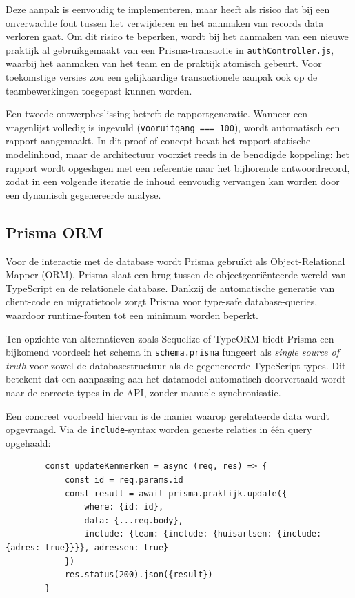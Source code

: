 Deze aanpak is eenvoudig te implementeren, maar heeft als risico dat bij een onverwachte fout tussen het verwijderen en het aanmaken van records data verloren gaat.
Om dit risico te beperken, wordt bij het aanmaken van een nieuwe praktijk al gebruikgemaakt van een Prisma-transactie in \texttt{authController.js}, waarbij het aanmaken van het team en de praktijk atomisch gebeurt.
Voor toekomstige versies zou een gelijkaardige transactionele aanpak ook op de teambewerkingen toegepast kunnen worden.
\medskip

Een tweede ontwerpbeslissing betreft de rapportgeneratie. 
Wanneer een vragenlijst volledig is ingevuld (\texttt{vooruitgang === 100}), wordt automatisch een rapport aangemaakt.
In dit proof-of-concept bevat het rapport statische modelinhoud, maar de architectuur voorziet reeds in de benodigde koppeling: het rapport wordt opgeslagen met een referentie naar het bijhorende antwoordrecord, zodat in een volgende iteratie de inhoud eenvoudig vervangen kan worden door een dynamisch gegenereerde analyse.

\subsection{Prisma ORM}
\label{subsec:prisma}

Voor de interactie met de database wordt Prisma gebruikt als Object-Relational Mapper (ORM). 
Prisma slaat een brug tussen de objectgeoriënteerde wereld van TypeScript en de relationele database. 
Dankzij de automatische generatie van client-code en migratietools zorgt Prisma voor type-safe database-queries, waardoor runtime-fouten tot een minimum worden beperkt.
\medskip

Ten opzichte van alternatieven zoals Sequelize of TypeORM biedt Prisma een bijkomend voordeel: het schema in \texttt{schema.prisma} fungeert als \textit{single source of truth} voor zowel de databasestructuur als de gegenereerde TypeScript-types.
Dit betekent dat een aanpassing aan het datamodel automatisch doorvertaald wordt naar de correcte types in de API, zonder manuele synchronisatie.
\medskip

Een concreet voorbeeld hiervan is de manier waarop gerelateerde data wordt opgevraagd.
Via de \texttt{include}-syntax worden geneste relaties in één query opgehaald:
 
\begin{listing}
    \begin{verbatim}
        const updateKenmerken = async (req, res) => {
            const id = req.params.id
            const result = await prisma.praktijk.update({
                where: {id: id},
                data: {...req.body},
                include: {team: {include: {huisartsen: {include: {adres: true}}}}, adressen: true}
            })
            res.status(200).json({result})
        }
    \end{verbatim}
    \caption[Voorbeeld include statement in prisma]{Voorbeeld include statement in prisma}
\end{listing}
 
